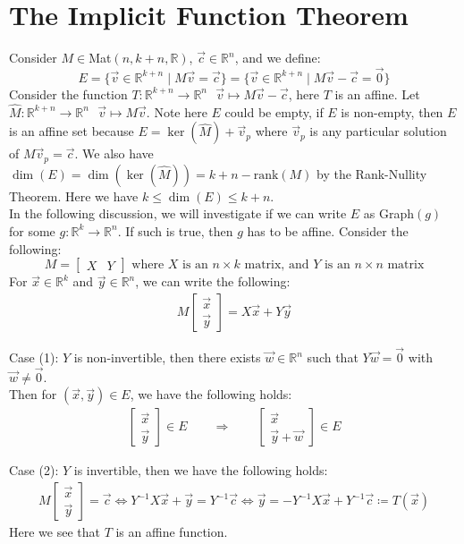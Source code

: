 \documentclass[15pt]{book}
\theoremstyle{break}
\theoremstyle{break}
\newcommand{\R}{\mathbb{R}}
\begin{document}
\newpage
\section[The Implicit Function Theorem]{\color{red}The Implicit Function Theorem \color{black}}
Consider $M \in $Mat$(n,k+n,\R)$, $\vec{c}\in \R^n$, and we define: 
$$E=\{ \vec{v}\in \R^{k+n} \mid M\vec{v} = \vec{c}\}=\{ \vec{v}\in \R^{k+n} \mid M\vec{v}- \vec{c}=\vec{0}\}$$ 
Consider the function $T:\R^{k+n} \to \R^{n} \ \ \ \vec{v}\mapsto M\vec{v}-\vec{c}$, here $T$ is an affine. Let $\hat{M}: \R^{k+n} \to \R^n \ \ \ \vec{v}\mapsto M\vec{v}$. Note here $E$ could be empty, if $E$ is non-empty, then $E $ is an affine set because $E=\ker(\hat{M})+\vec{v}_p$ where $\vec{v}_p$ is any particular solution of $M\vec{v}_p = \vec{c}$. We also have $\dim(E) = \dim(\ker(\hat{M})) = k+n - \text{rank}(M)$ by the Rank-Nullity Theorem. Here we have $k \leq \dim(E) \leq k+n$. \\

In the following discussion, we will investigate if we can write $E$ as Graph$(g)$ for some $g:\R^k \to \R^n$. If such is true, then $g$ has to be affine. Consider the following:
$$M=\begin{bmatrix}
X & Y
\end{bmatrix}\text{ where }X\text{ is an }n\times k\text{ matrix, and } Y \text{ is an }n\times n\text{ matrix}$$
For $\vec{x}\in \R^k$ and $\vec{y}\in \R^n$, we can write the following:
\begin{align*}
M\begin{bmatrix}
\vec{x}\\\vec{y}
\end{bmatrix} = X\vec{x} + Y\vec{y}
\end{align*}

Case (1): $Y$ is non-invertible, then there exists $\vec{w}\in \R^n$ such that $Y\vec{w} = \vec{0}$ with $\vec{w}\neq \vec{0}$.\\ Then for $(\vec{x},\vec{y}) \in E$, we have the following holds:
\begin{align*}
\begin{bmatrix}
\vec{x}\\\vec{y}
\end{bmatrix} \in E \qquad\Rightarrow \qquad \begin{bmatrix}
\vec{x}\\\vec{y}+\vec{w}
\end{bmatrix} \in E
\end{align*}

Case (2): $Y$ is invertible, then we have the following holds:
\begin{align*}
M\begin{bmatrix}
\vec{x}\\\vec{y}
\end{bmatrix} = \vec{c} \iff Y^{-1}X\vec{x} + \vec{y} = Y^{-1}\vec{c} \iff \vec{y} = -Y^{-1}X\vec{x}+ Y^{-1}\vec{c} \coloneqq T(\vec{x})
\end{align*}
Here we see that $T$ is an affine function.\\
\end{document}

